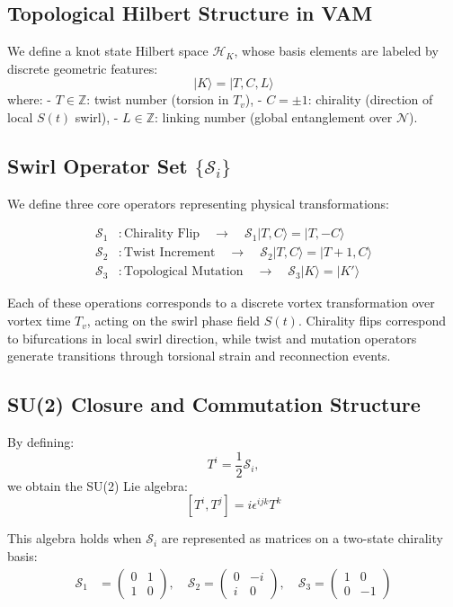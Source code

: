 \documentclass[12pt]{article}
\begin{document}
\subsection*{Topological Hilbert Structure in VAM}

We define a knot state Hilbert space \( \mathcal{H}_K \), whose basis elements are labeled by discrete geometric features:
\[
|K\rangle = |T, C, L\rangle
\]
where:
- \( T \in \mathbb{Z} \): twist number (torsion in $T_v$),
- \( C = \pm 1 \): chirality (direction of local $S(t)$ swirl),
- \( L \in \mathbb{Z} \): linking number (global entanglement over $\mathcal{N}$).

\subsection*{Swirl Operator Set \(\{\mathcal{S}_i\}\)}

We define three core operators representing physical transformations:

\begin{align}
\mathcal{S}_1 &: \text{Chirality Flip} \quad\rightarrow\quad \mathcal{S}_1 |T, C\rangle = |T, -C\rangle \\
\mathcal{S}_2 &: \text{Twist Increment} \quad\rightarrow\quad \mathcal{S}_2 |T, C\rangle = |T+1, C\rangle \\
\mathcal{S}_3 &: \text{Topological Mutation} \quad\rightarrow\quad \mathcal{S}_3 |K\rangle = |K'\rangle
\end{align}

Each of these operations corresponds to a discrete vortex transformation over vortex time \( T_v \), acting on the swirl phase field \( S(t) \). Chirality flips correspond to bifurcations in local swirl direction, while twist and mutation operators generate transitions through torsional strain and reconnection events.

\subsection*{SU(2) Closure and Commutation Structure}

By defining:
\[
T^i = \frac{1}{2} \mathcal{S}_i,
\]
we obtain the SU(2) Lie algebra:
\[
[T^i, T^j] = i \epsilon^{ijk} T^k
\]

This algebra holds when \( \mathcal{S}_i \) are represented as matrices on a two-state chirality basis:
\begin{align}
\mathcal{S}_1 &= \begin{pmatrix} 0 & 1 \\ 1 & 0 \end{pmatrix}, \quad
\mathcal{S}_2 = \begin{pmatrix} 0 & -i \\ i & 0 \end{pmatrix}, \quad
\mathcal{S}_3 = \begin{pmatrix} 1 & 0 \\ 0 & -1 \end{pmatrix}
\end{align}
\end{document}
